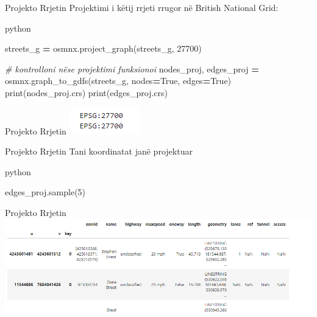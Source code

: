 \documentclass[
  ignorenonframetext,
]{beamer}
\newenvironment{Shaded}{\begin{snugshade}}{\end{snugshade}}
\newcommand{\BuiltInTok}[1]{#1}
\newcommand{\CommentTok}[1]{\textcolor[rgb]{0.56,0.35,0.01}{\textit{#1}}}
\newcommand{\DecValTok}[1]{\textcolor[rgb]{0.00,0.00,0.81}{#1}}
\newcommand{\NormalTok}[1]{#1}
\newcommand{\OperatorTok}[1]{\textcolor[rgb]{0.81,0.36,0.00}{\textbf{#1}}}
\newcommand{\VariableTok}[1]{\textcolor[rgb]{0.00,0.00,0.00}{#1}}
\begin{document}
\begin{frame}[fragile]{Projekto Rrjetin}
\protect\hypertarget{projekto-rrjetin-2}{}
Projektimi i këtij rrjeti rrugor në British National Grid:

python

\begin{Shaded}
\begin{Highlighting}[]
\NormalTok{streets\_g }\OperatorTok{=}\NormalTok{ osmnx.project\_graph(streets\_g, }\DecValTok{27700}\NormalTok{)}

\CommentTok{\# kontrolloni nëse projektimi funksionoi}
\NormalTok{nodes\_proj, edges\_proj }\OperatorTok{=}\NormalTok{ osmnx.graph\_to\_gdfs(streets\_g, nodes}\OperatorTok{=}\VariableTok{True}\NormalTok{, edges}\OperatorTok{=}\VariableTok{True}\NormalTok{)}
\BuiltInTok{print}\NormalTok{(nodes\_proj.crs)}
\BuiltInTok{print}\NormalTok{(edges\_proj.crs)}
\end{Highlighting}
\end{Shaded}
\end{frame}

\begin{frame}{Projekto Rrjetin}
\protect\hypertarget{projekto-rrjetin-3}{}
\includegraphics{./Figs/rrjetikor2.png}
\end{frame}

\begin{frame}[fragile]{Projekto Rrjetin}
\protect\hypertarget{projekto-rrjetin-4}{}
Tani koordinatat janë projektuar

python

\begin{Shaded}
\begin{Highlighting}[]
\NormalTok{edges\_proj.sample(}\DecValTok{5}\NormalTok{)}
\end{Highlighting}
\end{Shaded}
\end{frame}

\begin{frame}{Projekto Rrjetin}
\protect\hypertarget{projekto-rrjetin-5}{}
\includegraphics{./Figs/rrjetikor3.png}
\end{frame}
\end{document}
